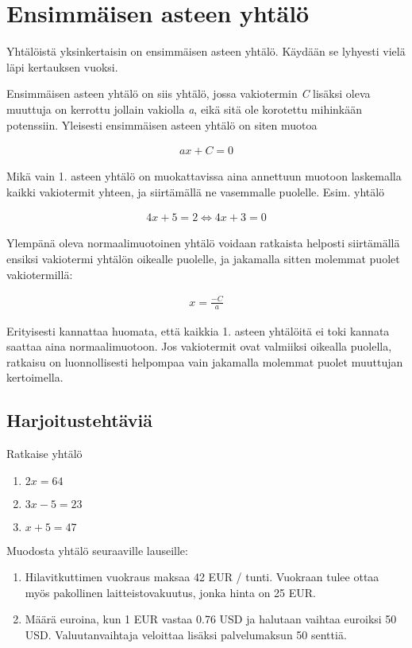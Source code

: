 \chapter{Ensimmäisen asteen yhtälö}

Yhtälöistä yksinkertaisin on ensimmäisen asteen yhtälö. Käydään se lyhyesti
vielä läpi kertauksen vuoksi.

Ensimmäisen asteen yhtälö on siis yhtälö, jossa vakiotermin \emph{C} lisäksi
oleva muuttuja on kerrottu jollain vakiolla \emph{a}, eikä sitä ole korotettu
mihinkään potenssiin. Yleisesti ensimmäisen asteen yhtälö on siten muotoa

\begin{align*}
    ax + C = 0
\end{align*}

Mikä vain 1. asteen yhtälö on muokattavissa aina
annettuun muotoon laskemalla kaikki vakiotermit yhteen,
ja siirtämällä ne vasemmalle puolelle. Esim. yhtälö

\begin{align*}
    4x + 5 = 2 \Leftrightarrow 4x + 3 = 0
\end{align*}

Ylempänä oleva normaalimuotoinen yhtälö voidaan ratkaista helposti siirtämällä
ensiksi vakiotermi yhtälön oikealle puolelle, ja jakamalla sitten molemmat puolet vakiotermillä:

\begin{align*}
    x = \frac{-C}{a}
\end{align*}

Erityisesti kannattaa huomata, että kaikkia 1. asteen yhtälöitä ei toki kannata
saattaa aina normaalimuotoon. Jos vakiotermit ovat valmiiksi oikealla puolella,
ratkaisu on luonnollisesti helpompaa vain jakamalla molemmat puolet muuttujan kertoimella.

\section{Harjoitustehtäviä}

\begin{tehtava}
  Ratkaise yhtälö
  \begin{enumerate}
    \item $2x = 64$
    \item $3x - 5 = 23$
    \item $x + 5 = 47$
  \end{enumerate}
\end{tehtava}

\begin{tehtava}
  Muodosta yhtälö seuraaville lauseille:
  \begin{enumerate}
    \item Hilavitkuttimen vuokraus maksaa 42 EUR / tunti. Vuokraan tulee ottaa myös pakollinen laitteistovakuutus, jonka hinta on 25 EUR.
    \item Määrä euroina, kun 1 EUR vastaa 0.76 USD ja halutaan vaihtaa euroiksi 50 USD. Valuutanvaihtaja veloittaa lisäksi palvelumaksun 50 senttiä.
  \end{enumerate}
\end{tehtava}
